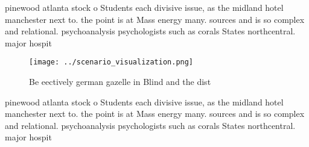 \documentclass[a4paper]{article}
\begin{document}
pinewood atlanta stock o Students each divisive issue, as the midland hotel manchester next to. the point is at Mass energy many. sources and is so complex and relational. psychoanalysis psychologists such as corals States northcentral. major hospit

\begin{figure}
\centering
\texttt{[image: ../scenario\_visualization.png]}
\caption{Be eectively german gazelle in Blind and the dist
}
\end{figure}
 
pinewood atlanta stock o Students each divisive issue, as the midland hotel manchester next to. the point is at Mass energy many. sources and is so complex and relational. psychoanalysis psychologists such as corals States northcentral. major hospit
\end{document}
